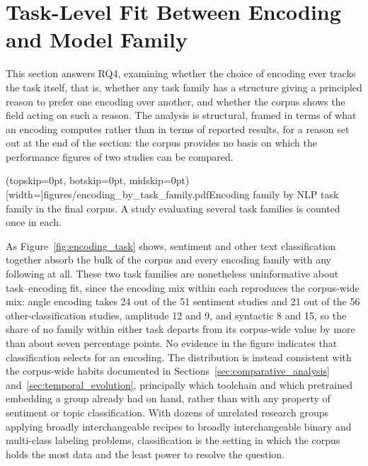\documentclass{ieeeaccess}
\begin{document}
\section{Task-Level Fit Between Encoding and Model Family}
\label{sec:task_fit}

This section answers RQ4, examining whether the choice of encoding ever tracks the task itself, that is, whether any task family has a structure giving a principled reason to prefer one encoding over another, and whether the corpus shows the field acting on such a reason. The analysis is structural, framed in terms of what an encoding computes rather than in terms of reported results, for a reason set out at the end of the section: the corpus provides no basis on which the performance figures of two studies can be compared.

\Figure[t!](topskip=0pt, botskip=0pt, midskip=0pt)[width=\textwidth]{figures/encoding_by_task_family.pdf}{Encoding family by NLP task family in the final corpus. A study evaluating several task families is counted once in each.\label{fig:encoding_task}}

As Figure~\ref{fig:encoding_task} shows, sentiment and other text classification together absorb the bulk of the corpus and every encoding family with any following at all. These two task families are nonetheless uninformative about task--encoding fit, since the encoding mix within each reproduces the corpus-wide mix: angle encoding takes 24 out of the 51 sentiment studies and 21 out of the 56 other-classification studies, amplitude 12 and 9, and syntactic 8 and 15, so the share of no family within either task departs from its corpus-wide value by more than about seven percentage points. No evidence in the figure indicates that classification selects for an encoding. The distribution is instead consistent with the corpus-wide habits documented in Sections~\ref{sec:comparative_analysis} and~\ref{sec:temporal_evolution}, principally which toolchain and which pretrained embedding a group already had on hand, rather than with any property of sentiment or topic classification. With dozens of unrelated research groups applying broadly interchangeable recipes to broadly interchangeable binary and multi-class labeling problems, classification is the setting in which the corpus holds the most data and the least power to resolve the question.
\end{document}
